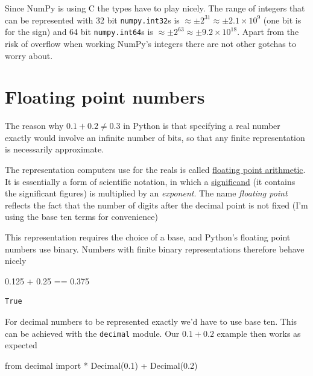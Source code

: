 \documentclass[
  letterpaper,
  DIV=11,
  numbers=noendperiod]{scrreprt}
\newenvironment{Shaded}{\begin{snugshade}}{\end{snugshade}}
\newcommand{\FloatTok}[1]{\textcolor[rgb]{0.68,0.00,0.00}{#1}}
\newcommand{\ImportTok}[1]{\textcolor[rgb]{0.00,0.46,0.62}{#1}}
\newcommand{\NormalTok}[1]{\textcolor[rgb]{0.00,0.23,0.31}{#1}}
\newcommand{\OperatorTok}[1]{\textcolor[rgb]{0.37,0.37,0.37}{#1}}
\newcommand{\StringTok}[1]{\textcolor[rgb]{0.13,0.47,0.30}{#1}}
\theoremstyle{definition}
\theoremstyle{remark}
\begin{document}
Since NumPy is using C the types have to play nicely. The range of
integers that can be represented with 32 bit \texttt{numpy.int32}s is
\(\approx\pm 2^{31} \approx \pm 2.1 × 10^9\) (one bit is for the sign)
and 64 bit \texttt{numpy.int64}s is
\(\approx\pm 2^{63} \approx \pm 9.2 × 10^{18}\). Apart from the risk of
overflow when working NumPy's integers there are not other gotchas to
worry about.

\hypertarget{floating-point-numbers}{%
\section{Floating point numbers}\label{floating-point-numbers}}

The reason why \(0.1 + 0.2 \neq 0.3\) in Python is that specifying a
real number exactly would involve an infinite number of bits, so that
any finite representation is necessarily approximate.

The representation computers use for the reals is called
\href{https://en.wikipedia.org/wiki/Floating-point_arithmetic}{floating
point arithmetic}. It is essentially a form of scientific notation, in
which a \href{https://en.wikipedia.org/wiki/Significand}{significand}
(it contains the significant figures) is multiplied by an
\emph{exponent}. The name \emph{floating point} reflects the fact that
the number of digits after the decimal point is not fixed (I'm using the
base ten terms for convenience)

This representation requires the choice of a base, and Python's floating
point numbers use binary. Numbers with finite binary representations
therefore behave nicely

\begin{Shaded}
\begin{Highlighting}[]
\FloatTok{0.125} \OperatorTok{+} \FloatTok{0.25} \OperatorTok{==} \FloatTok{0.375}
\end{Highlighting}
\end{Shaded}

\begin{verbatim}
True
\end{verbatim}

For decimal numbers to be represented exactly we'd have to use base ten.
This can be achieved with the \texttt{decimal} module. Our \(0.1+0.2\)
example then works as expected

\begin{Shaded}
\begin{Highlighting}[]
\ImportTok{from}\NormalTok{ decimal }\ImportTok{import} \OperatorTok{*}
\NormalTok{Decimal(}\StringTok{\textquotesingle{}0.1\textquotesingle{}}\NormalTok{) }\OperatorTok{+}\NormalTok{ Decimal(}\StringTok{\textquotesingle{}0.2\textquotesingle{}}\NormalTok{)}
\end{Highlighting}
\end{Shaded}
\end{document}
